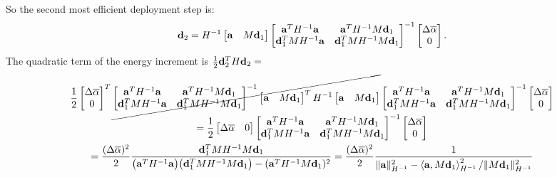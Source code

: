 \documentclass[10pt]{article}
\begin{document}
So the second most efficient deployment step is:
$$
    {\bf d}_2 = H^{-1} \begin{bmatrix} {\bf a} & M {\bf d}_1 \end{bmatrix}
\begin{bmatrix} {\bf a}^T H^{-1} {\bf a} & {\bf a}^T H^{-1} M {\bf d}_1 \\
                     {\bf d}_1^T M H^{-1} {\bf a} & {\bf d}_1^T M H^{-1} M {\bf d}_1
\end{bmatrix}^{-1}
\begin{bmatrix} \Delta \overline{\alpha} \\ 0 \end{bmatrix}.
$$
The quadratic term of the energy increment is $\frac{1}{2}{\bf d}_2^T H {\bf d}_2 = $
\begin{gather*}
    \frac{1}{2}
    \begin{bmatrix} \Delta \overline{\alpha} \\ 0 \end{bmatrix}^T
    \cancel{
        \begin{bmatrix} {\bf a}^T H^{-1} {\bf a} & {\bf a}^T H^{-1} M {\bf d}_1 \\
                             {\bf d}_1^T M H^{-1} {\bf a} & {\bf d}_1^T M H^{-1} M {\bf d}_1
        \end{bmatrix}^{-1}
            \begin{bmatrix} {\bf a} & M {\bf d}_1 \end{bmatrix}^T
            H^{-1}
            \begin{bmatrix} {\bf a} & M {\bf d}_1 \end{bmatrix}
    }
    \begin{bmatrix} {\bf a}^T H^{-1} {\bf a} & {\bf a}^T H^{-1} M {\bf d}_1 \\
                         {\bf d}_1^T M H^{-1} {\bf a} & {\bf d}_1^T M H^{-1} M {\bf d}_1
    \end{bmatrix}^{-1}
    \begin{bmatrix} \Delta \overline{\alpha} \\ 0 \end{bmatrix}
\\
= 
    \frac{1}{2}
    \begin{bmatrix} \Delta \overline{\alpha} & 0 \end{bmatrix}
        \begin{bmatrix} {\bf a}^T H^{-1} {\bf a} & {\bf a}^T H^{-1} M {\bf d}_1 \\
                             {\bf d}_1^T M H^{-1} {\bf a} & {\bf d}_1^T M H^{-1} M {\bf d}_1
        \end{bmatrix}^{-1}
    \begin{bmatrix} \Delta \overline{\alpha} \\ 0 \end{bmatrix}
\\
= 
    \frac{(\Delta \overline{\alpha})^2}{2}
    \frac{{\bf d}_1^T M H^{-1} M {\bf d}_1}{\big({\bf a}^T H^{-1} {\bf a}\big)\big({\bf d}_1^T M H^{-1} M {\bf d}_1\big) - ({\bf a}^T H^{-1} M {\bf d}_1)^2}
= 
    \frac{(\Delta \overline{\alpha})^2}{2}
    \frac{1}{\lVert{\bf a}\rVert_{H^{-1}}^2 - \left<{\bf a}, M {\bf d}_1\right>_{H^{-1}}^2 / \lVert M {\bf d}_1\rVert_{H^{-1}}^2}
\end{gather*}
\end{document}
